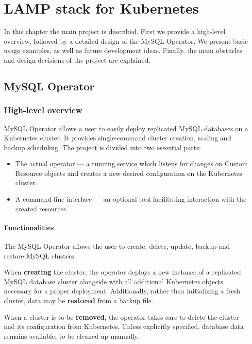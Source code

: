 \chapter{LAMP stack for Kubernetes}
In this chapter the main project is described. First we provide a high-level overview,
followed by a detailed design of the MySQL Operator. We present basic usage examples,
as well as future development ideas. Finally, the main obstacles and design decisions
of the project are explained.

\section{MySQL Operator}

\subsection{High-level overview}
MySQL Operator allows a user to easily deploy replicated MySQL databases on a Kubernetes
cluster. It provides single-command cluster creation, scaling and backup scheduling.
The project is divided into two essential parts:
\begin{itemize}
	\item The actual operator --- a running service which listens for changes on Custom
	Resource objects and creates a new desired configuration on the Kubernetes cluster.
	\item A command line interface --- an optional tool facilitating interaction with
	the created resources.
\end{itemize}

\subsubsection{Functionalities}
The MySQL Operator allows the user to create, delete, update, backup and restore MySQL
clusters.

When \textbf{creating} the cluster, the operator deploys a new instance of a replicated
MySQL database cluster alongside with all additional Kubernetes objects necessary for
a proper deployment. Additionally, rather than initializing a fresh cluster, data may be
\textbf{restored} from a backup file.

When a cluster is to be \textbf{removed}, the operator takes care to delete the cluster
and its configuration from Kubernetes. Unless explicitly specified, database data remains
available, to be cleaned up manually.

